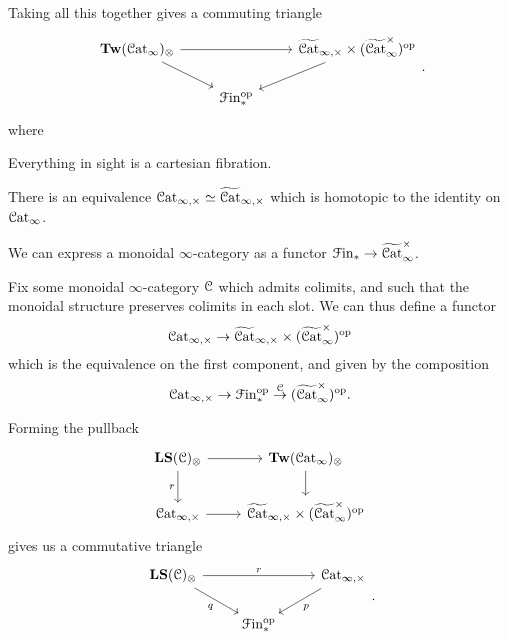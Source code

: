 \documentclass[main.tex]{subfiles}
\begin{document}
Taking all this together gives a commuting triangle
\begin{equation*}
  \begin{tikzcd}
    \Tw(\ICat)_{\otimes}
    \arrow[rr]
    \arrow[dr]
    && \TICatCart \times (\TICatCocart)\op
    \arrow[dl]
    \\
    & \Finp\op
  \end{tikzcd}.
\end{equation*}
where
\begin{proposition}
  Everything in sight is a cartesian fibration.
\end{proposition}

\begin{proposition}
  There is an equivalence $\mathcal{C}\mathrm{at}_{\infty,\times} \simeq \widetilde{\mathcal{C}\mathrm{at}}_{\infty,\times}$ which is homotopic to the identity on $\mathcal{C}\mathrm{at}_{\infty}$.
\end{proposition}

\begin{proposition}
  We can express a monoidal $\infty$-category as a functor $\mathcal{F}\mathrm{in}_{*} \to \widetilde{\mathcal{C}\mathrm{at}}_{\infty}^{\times}$.
\end{proposition}

Fix some monoidal $\infty$-category $\mathcal{C}$ which admits colimits, and such that the monoidal structure preserves colimits in each slot. We can thus define a functor
\begin{equation*}
  \mathcal{C}\mathrm{at}_{\infty,\times} \to \widetilde{\mathcal{C}\mathrm{at}}_{\infty,\times} \times (\widetilde{\mathcal{C}\mathrm{at}}_{\infty}^{\times})^{\mathrm{op}}
\end{equation*}
which is the equivalence on the first component, and given by the composition
\begin{equation*}
  \mathcal{C}\mathrm{at}_{\infty,\times} \to \mathcal{F}\mathrm{in}_{*}^{\mathrm{op}} \overset{\mathcal{C}}{\to} (\widetilde{\mathcal{C}\mathrm{at}}_{\infty}^{\times})^{\mathrm{op}}.
\end{equation*}

Forming the pullback
\begin{equation*}
  \begin{tikzcd}
    \LS(\category{C})_{\otimes}
    \arrow[r]
    \arrow[d, swap, "r"]
    & \Tw(\ICat)_{\otimes}
    \arrow[d]
    \\
    \ICatCart
    \arrow[r]
    & \TICatCart \times (\TICatCocart)\op
  \end{tikzcd}
\end{equation*}
gives us a commutative triangle
\begin{equation*}
  \begin{tikzcd}
    \LS(\category{C})_{\otimes}
    \arrow[rr, "r"]
    \arrow[dr, swap, "q"]
    && \ICatCart
    \arrow[dl, "p"]
    \\
    & \Finp\op
  \end{tikzcd}.
\end{equation*}
\end{document}
